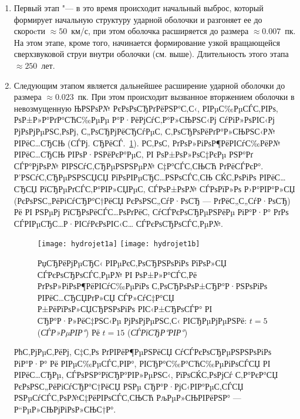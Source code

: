 \begin{enumerate}
\item Первый этап "--- в это время происходит начальный выброс, который
формирует начальную структуру ударной оболочки и разгоняет ее до
скороcти ${\approx 50}$~км/с, при этом оболочка расширяется до размера
${\approx 0.007}$~пк. На этом этапе, кроме того, начинается формирование
узкой вращающейся сверхзвуковой струи внутри оболочки (см. выше).
Длительность этого этапа ${\approx 250}$~лет.

\item Следующим этапом является дальнейшее расширение ударной оболочки
до размера ${\approx 0.023}$~пк. При этом происходит вызванное вторжением
оболочки в невозмущенную ЊРЅРѕР№ РєРѕРѕСЂРґРёРЅР°С‚С‹, РІРµС‰РµСЃС‚РІРѕ, РѕР±Р»Р°РґР°СЋС‰РµРµ
Р°Р·РёРјСѓС‚Р°Р»СЊРЅС‹Рј СѓРіР»РѕРІС‹Рј РјРѕРјРµРЅС‚РѕРј, С„РѕСЂРјРёСЂСѓРµС‚ С‚РѕСЂРѕРёРґР°Р»СЊРЅС‹Р№ РІРёС…СЂСЊ
(СЃРј. СЂРёСЃ.~\ref{fig:kmx:vectors}). Р­С‚РѕС‚ РґРѕР»РіРѕР¶РёРІСѓС‰РёР№ РІРёС…СЂСЊ РІРѕР·РЅРёРєР°РµС‚ РІ РѕР±РѕР»РѕС‡РєРµ
РЅР°Рґ СЃР°РјРѕР№ РІРЅСѓС‚СЂРµРЅРЅРµР№ С‡Р°СЃС‚СЊСЋ РґРёСЃРєР°. Р’РЅСѓС‚СЂРµРЅРЅСЏСЏ РїРѕРІРµСЂС…РЅРѕСЃС‚СЊ СЌС‚РѕРіРѕ
РІРёС…СЂСЏ РїСЂРµРґСЃС‚Р°РІР»СЏРµС‚ СЃРѕР±РѕР№ СЃРѕРїР»Рѕ Р›Р°РІР°Р»СЏ (РєРѕРЅС„РёРіСѓСЂР°С†РёСЏ
РєРѕРЅС„СѓР·РѕСЂ --- РґРёС„С„СѓР·РѕСЂ) Рё РІ РЅРµРј РїСЂРѕРёСЃС…РѕРґРёС‚ СѓСЃРєРѕСЂРµРЅРёРµ РіР°Р·Р° РґРѕ
СЃРІРµСЂС…Р·РІСѓРєРѕРІС‹С… СЃРєРѕСЂРѕСЃС‚РµР№.

\begin{figure}[!htb]
\centering
\texttt{[image: hydrojet1a]}
\texttt{[image: hydrojet1b]}
\caption{РџСЂРёРјРµСЂС‹ РІРµРєС‚РѕСЂРЅРѕРіРѕ РїРѕР»СЏ СЃРєРѕСЂРѕСЃС‚РµР№ РІ РѕР±Р»Р°СЃС‚Рё РґРѕР»РіРѕР¶РёРІСѓС‰РµРіРѕ С‚РѕСЂРѕРѕР±СЂР°Р·РЅРѕРіРѕ РІРёС…СЂСЏ\plb РґР»СЏ СЃР»СѓС‡Р°СЏ Р±РёРїРѕР»СЏСЂРЅРѕРіРѕ РІС‹Р±СЂРѕСЃР° РІ СЂР°Р·Р»РёС‡РЅС‹Рµ РјРѕРјРµРЅС‚С‹ РІСЂРµРјРµРЅРё: ${t = 5}$ (\emph{СЃР»РµРІР°}) Рё ${t = 15}$ (\emph{СЃРїСЂР°РІР°})}
\label{fig:kmx:vectors}\vspace*{5mm}
\end{figure}

РћС‚РјРµС‚РёРј, С‡С‚Рѕ РґРІРёР¶РµРЅРёСЏ СѓСЃРєРѕСЂРµРЅРЅРѕРіРѕ РіР°Р·Р° Рё РІРµС‰РµСЃС‚РІР°, РІСЂР°С‰Р°СЋС‰РµРіРѕСЃСЏ
РІ РІРёС…СЂРµ, СЃРѕРЅР°РїСЂР°РІР»РµРЅС‹, РїРѕСЌС‚РѕРјСѓ С‚Р°РєР°СЏ РєРѕРЅС„РёРіСѓСЂР°С†РёСЏ РЅРµ СЂР°Р·РјС‹РІР°РµС‚СЃСЏ
РЅРµСѓСЃС‚РѕР№С‡РёРІРѕСЃС‚СЊСЋ РљРµР»СЊРІРёРЅР° --- Р“РµР»СЊРјРіРѕР»СЊС†Р°.


\end{enumerate}
